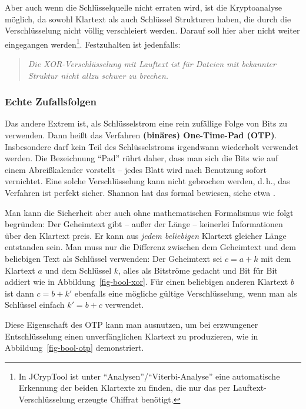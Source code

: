 \begin{refsegment}
Aber auch wenn die Schlüsselquelle nicht erraten wird, ist die Kryptoanalyse
möglich, da sowohl Klartext als auch Schlüssel Strukturen haben, die
durch die Verschlüsselung nicht völlig verschleiert werden. Darauf
soll hier aber nicht weiter eingegangen werden\footnote{%
   In JCrypTool ist unter "`Analysen"'/"`Viterbi-Analyse"' eine automatische
   Erkennung der beiden Klartexte zu finden, die nur das per
   Lauftext-Verschlüsselung erzeugte Chiffrat benötigt.
}. Festzuhalten ist jedenfalls:
\begin{quote}
   {\em Die XOR-Verschlüsselung mit Lauftext ist für
   Dateien mit bekannter Struktur nicht allzu schwer zu brechen.}
\end{quote}


\subsubsection*{Echte Zufallsfolgen}\label{s-bool-bitstr-real-random}

Das andere Extrem ist, als Schlüsselstrom eine
rein zufällige Folge von Bits zu verwenden. Dann heißt das Verfahren
{\bf (binäres) One-Time-Pad (OTP)}.
Insbesondere darf kein Teil des Schlüsselstroms irgendwann wiederholt
verwendet werden. Die Bezeichnung "`Pad"' rührt daher, dass man sich
die Bits wie auf einem Abreißkalender vorstellt  -- jedes Blatt wird
nach Benutzung sofort vernichtet. Eine solche
Verschlüsselung kann nicht gebrochen werden, d.\,h., das Verfahren ist
perfekt sicher. Shannon hat das formal bewiesen,
siehe etwa \cite{Stin2006}.

Man kann die Sicherheit aber auch ohne mathematischen Formalismus wie
folgt begründen: Der Geheimtext gibt -- außer der Länge -- keinerlei
Informationen über den Klartext preis. Er kann aus {\em jedem beliebigen}
Klartext gleicher Länge entstanden sein. Man muss nur die Differenz
zwischen dem Geheimtext und dem beliebigen Text als Schlüssel verwenden:
Der Geheimtext sei $c = a + k$ mit dem Klartext $a$ und dem Schlüssel
$k$, alles als Bitströme gedacht und Bit für Bit addiert wie in
Abbildung~\ref{fig-bool-xor}. Für einen beliebigen anderen Klartext
$b$ ist dann $c = b + k'$ ebenfalls eine mögliche gültige Verschlüsselung,
wenn man als Schlüssel einfach $k' = b + c$ verwendet.

Diese Eigenschaft des OTP kann man ausnutzen, um bei erzwungener
Entschlüsselung einen unverfänglichen Klartext zu produzieren, wie
in Abbildung~\ref{fig-bool-otp} demonstriert.


\end{refsegment}
